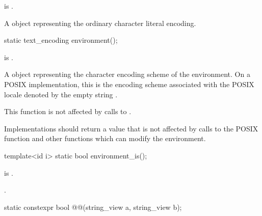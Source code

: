 \begin{itemdescr}
\pnum
\mandates
{} is .

\pnum
\returns
A  object representing
the ordinary character literal encoding.
\end{itemdescr}

%
\begin{itemdecl}
static text_encoding environment();
\end{itemdecl}

\begin{itemdescr}
\pnum
\mandates
{} is .

\pnum
\returns
A  object representing
the 
character encoding scheme of the environment.
On a POSIX implementation, this is the encoding scheme associated with
the POSIX locale denoted by the empty string .

\pnum
\begin{note}
This function is not affected by calls to .
\end{note}

\pnum
\recommended
Implementations should return a value that is not affected by calls to
the POSIX function  and
other functions which can modify the environment.
\end{itemdescr}

%
\begin{itemdecl}
template<id i>
  static bool environment_is();
\end{itemdecl}

\begin{itemdescr}
\pnum
\mandates
{} is .

\pnum
\returns
{}.
\end{itemdescr}

%
\begin{itemdecl}
static constexpr bool @@(string_view a, string_view b);
\end{itemdecl}

